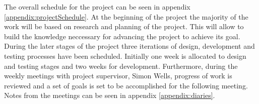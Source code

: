 The overall schedule for the project can be seen in appendix \ref{appendix:projectSchedule}. At the beginning of the project the majority of the work will be based on research and planning of the project. This will allow to build the knowledge neccessary for advancing the project to achieve its goal. During the later stages of the project three iterations of design, development and testing processes have been scheduled. Initially one week is allocated to design and testing stages and two weeks for development. Furthermore, during the weekly meetings with project supervisor, Simon Wells, progress of work is reviewed and a set of goals is set to be accomplished for the following meeting. Notes from the meetings can be seen in appendix \ref{appendix:diaries}. 
